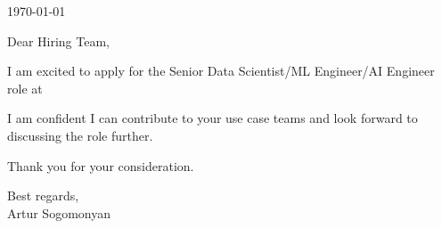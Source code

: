 \documentclass{ExpressiveCoverLetter}
\begin{document}
\coverletterheader[
    firstname=Artur,
    lastname=Sogomonyan,
    email=arthur.sogomonyan@gmail.com,
    phone=+43-677-641-145-81,
    linkedin=artur-sogomonyan,
    github=PropovedNik007,
    website=arterra,
    city=Vienna,
    state=Austria
]

\vspace{0.25in}
\today
\vspace{0.15in}

Dear Hiring Team,

I am excited to apply for the Senior Data Scientist/ML Engineer/AI Engineer role at 

I am confident I can contribute to your use case teams and look forward to discussing the role further.

Thank you for your consideration.

Best regards, \\
Artur Sogomonyan
\end{document}
